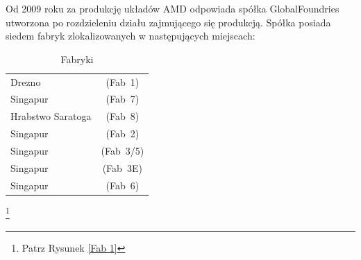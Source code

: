\documentclass[a4paper,12pt]{article}
\begin{document}
Od 2009 roku za produkcję układów AMD odpowiada spółka GlobalFoundries utworzona po rozdzieleniu działu zajmującego się produkcją. Spółka posiada siedem fabryk zlokalizowanych w następujących miejscach:

\begin{table}[h]
\centering \caption{Fabryki}
\begin{tabular}{lc}
\hline
Drezno&(Fab~1)\\
Singapur&(Fab~7)\\
Hrabstwo Saratoga&(Fab~8)\\
Singapur&(Fab~2)\\
Singapur&(Fab~3/5)\\
Singapur&(Fab~3E)\\
Singapur&(Fab~6)\\
\end{tabular}
\end{table}

\footnote{Patrz Rysunek \ref{Fab 1}}
\end{document}
